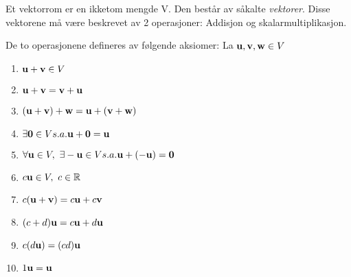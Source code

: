Et vektorrom er en ikketom mengde V.
Den består av såkalte \emph{vektorer}.
Disse vektorene må være beskrevet av 2 operasjoner:
Addisjon og skalarmultiplikasjon.

De to operasjonene defineres av følgende aksiomer:
La $\mathbf{u},\mathbf{v},\mathbf{w} \in V$
\begin{enumerate}
  \item $\mathbf{u} + \mathbf{v} \in V$
  \item $\mathbf{u} + \mathbf{v} = \mathbf{v} + \mathbf{u}$
  \item $(\mathbf{u}+\mathbf{v})+\mathbf{w} = \mathbf{u}+(\mathbf{v}+\mathbf{w})$
  \item $\exists \mathbf{0} \in V s.a. \mathbf{u}+\mathbf{0}=\mathbf{u}$
  \item $\forall \mathbf{u} \in V,\ \exists -\mathbf{u} \in V s.a. \mathbf{u}+(-\mathbf{u})=\mathbf{0}$
  \item $c\vecu \in V,\ c\in\mathbb{R}$
  \item $c(\mathbf{u}+\mathbf{v}) = c\mathbf{u}+c\mathbf{v}$
  \item $(c+d)\mathbf{u} = c\mathbf{u}+d\mathbf{u}$
  \item $c(d\mathbf{u}) = (cd)\mathbf{u}$
  \item $1\mathbf{u} = \mathbf{u}$
\end{enumerate}
